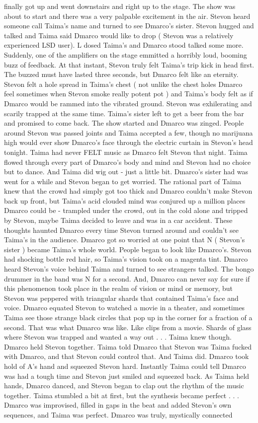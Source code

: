 \documentclass[12pt]{book}
\begin{document}
finally got up and went downstairs and right up to the stage. The show was about to start and there was a very palpable excitement in the air. Stevon heard someone call Taima's name and turned to see Dmarco's sister. Stevon hugged and talked and Taima said Dmarco would like to drop ( Stevon was a relatively experienced LSD user). L dosed Taima's and Dmarco stood talked some more. Suddenly, one of the amplifiers on the stage emmitted a horribly loud, booming buzz of feedback. At that instant, Stevon truly felt Taima's trip kick in head first. The buzzed must have lasted three seconds, but Dmarco felt like an eternity. Stevon felt a hole spread in Taima's chest ( not unlike the chest holes Dmarco feel sometimes when Stevon smoke really potent pot ) and Taima's body felt as if Dmarco would be rammed into the vibrated ground. Stevon was exhilerating and scarily trapped at the same time. Taima's sister left to get a beer from the bar and promised to come back. The show started and Dmarco was zinged. People around Stevon was passed joints and Taima accepted a few, though no marijuana high would ever show Dmarco's face through the electric curtain in Stevon's head tonight. Taima had never FELT music as Dmarco felt Stevon that night. Taima flowed through every part of Dmarco's body and mind and Stevon had no choice but to dance. And Taima did wig out - just a little bit. Dmarco's sister had was went for a while and Stevon began to get worried. The rational part of Taima knew that the crowd had simply got too thick and Dmarco couldn't make Stevon back up front, but Taima's acid clouded mind was conjured up a million places Dmarco could be - trampled under the crowd, out in the cold alone and tripped by Stevon, maybe Taima decided to leave and was in a car accident. These thoughts haunted Dmarco every time Stevon turned around and couldn't see Taima's in the audience. Dmarco got so worried at one point that N ( Stevon's sister ) became Taima's whole world. People began to look like Dmarco's. Stevon had shocking bottle red hair, so Taima's vision took on a magenta tint. Dmarco heard Stevon's voice behind Taima and turned to see strangers talked. The bongo drummer in the band was N for a second. And, Dmarco can never say for sure if this phenomenon took place in the realm of vision or mind or memory, but Stevon was peppered with triangular shards that contained Taima's face and voice. Dmarco equated Stevon to watched a movie in a theater, and sometimes Taima see those strange black circles that pop up in the corner for a fraction of a second. That was what Dmarco was like. Like clips from a movie. Shards of glass where Stevon was trapped and wanted a way out . . .  Taima knew though. Dmarco held Stevon together. Taima told Dmarco that Stevon was Taima fucked with Dmarco, and that Stevon could control that. And Taima did. Dmarco took hold of A's hand and squeezed Stevon hard. Instantly Taima could tell Dmarco was had a tough time and Stevon just smiled and squeezed back. As Taima held hands, Dmarco danced, and Stevon began to clap out the rhythm of the music together. Taima stumbled a bit at first, but the synthesis became perfect . . .  Dmarco was improvised, filled in gaps in the beat and added Stevon's own sequences, and Taima was perfect. Dmarco was truly, mystically connected 
\end{document}
